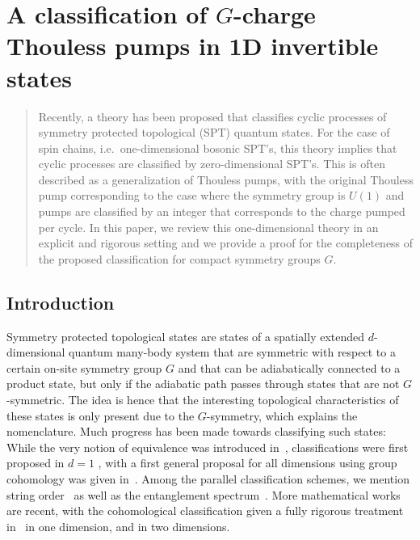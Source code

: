 \chapter{A classification of $G$-charge Thouless pumps in 1D invertible states}\label{ch:LoopSPT}
\begin{abstract} Recently, a theory has been proposed that classifies cyclic processes of symmetry protected topological (SPT) quantum states.  For the case of spin chains, i.e.\ one-dimensional bosonic SPT's, this theory implies that cyclic processes are classified by zero-dimensional SPT's. This is often described as a generalization of Thouless pumps, with the original Thouless pump corresponding to the case where the symmetry group is $U(1)$ and pumps are classified by an integer that corresponds to the charge pumped per cycle. 
	In this paper, we review this one-dimensional theory in an explicit and rigorous setting and we provide a proof for the completeness of the proposed classification for compact symmetry groups $G$. 
\end{abstract}



\section{Introduction}   \label{sec: introduction}

Symmetry protected topological states are states of a spatially extended $d$-dimensional quantum many-body system that are symmetric with respect to a certain on-site symmetry group $G$ and that can be adiabatically connected to a product state, but only if the adiabatic path passes through states that are not $G$-symmetric. The idea is hence that the interesting topological characteristics of these states is only present due to the $G$-symmetry, which explains the nomenclature. Much progress has been made towards classifying such states: While the very notion of equivalence was introduced in~\cite{chen2010local}, classifications were first proposed in $d=1$ \cite{chen_gu_wen_2011,schuch2011classifying,pollmann2012symmetry}, with a first general proposal for all dimensions using group cohomology was given in~\cite{Chen_2013}. Among the parallel classification schemes, we mention string order~\cite{nijs:1989a,perez2008string} as well as the entanglement spectrum~\cite{li2008entanglement,pollmann2010entanglement}. More mathematical works are recent, with the cohomological classification given a fully rigorous treatment in~\cite{OgataZ2,ogata2021classification,kapustin2021classification} in one dimension, and \cite{Ogata2d,sopenko2021index} in two dimensions.  

